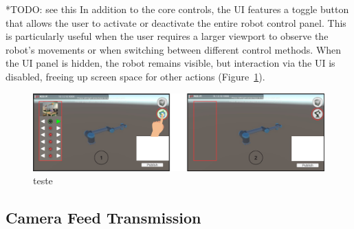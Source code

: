 *TODO: see this
    In addition to the core controls, the \ac{UI} features a toggle button that allows the user to activate or deactivate the entire robot control panel. This is particularly useful when the user requires a larger viewport to observe the robot's movements or when switching between different control methods. When the \ac{UI} panel is hidden, the robot remains visible, but interaction via the \ac{UI} is disabled, freeing up screen space for other actions (Figure~\ref{fig:teste}). 


\begin{figure}[h]
    \centering
    \includegraphics[width=\linewidth]{figs/mao-toca-ui-refeita-numbers.png}
    \caption{teste}
    \label{fig:teste}
\end{figure}


\subsection{Camera Feed Transmission}

